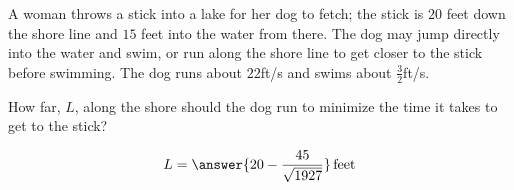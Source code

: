 \documentclass{ximera}
\author{Gregory Hartman \and Matthew Carr}
\begin{document}
\begin{exercise}




A woman throws a stick into a lake for her dog to fetch; the stick is
$20$ feet down the shore line and $15$ feet into the water from
there. The dog may jump directly into the water and swim, or run along
the shore line to get closer to the stick before swimming. The dog
runs about $22$ft/s and swims about $\frac{3}{2}$ft/s.

How far, $L$, along the shore should the dog run to minimize the time
it takes to get to the stick?
\begin{prompt}
\[
L=\answer{20-\frac{45}{\sqrt{1927}}}\,\text{feet}
\]
\end{prompt}



\end{exercise}
\end{document}
